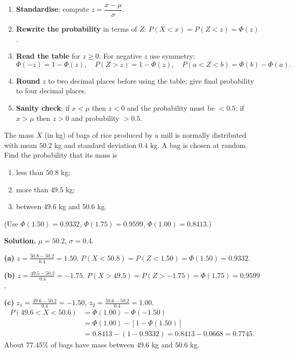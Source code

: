\documentclass[11pt]{article}
\begin{document}
\begin{methode}
\begin{enumerate}
\item \textbf{Standardise}: compute $z = \dfrac{x - \mu}{\sigma}$.
\item \textbf{Rewrite the probability} in terms of $Z$: $P(X < x) = P(Z < z) = \Phi(z)$.
\item \textbf{Read the table} for $z \geq 0$. For negative $z$ use symmetry:
\[
\Phi(-z) = 1 - \Phi(z), \quad P(Z > z) = 1 - \Phi(z), \quad P(a < Z < b) = \Phi(b) - \Phi(a).
\]
\item \textbf{Round} $z$ to two decimal places before using the table; give final probability to four decimal places.
\item \textbf{Sanity check}: if $x < \mu$ then $z < 0$ and the probability must be $< 0.5$; if $x > \mu$ then $z > 0$ and probability $> 0.5$.
\end{enumerate}
\end{methode}

\begin{exemplebox}
The mass $X$ (in kg) of bags of rice produced by a mill is normally distributed with mean $50.2$ kg and standard deviation $0.4$ kg. A bag is chosen at random. Find the probability that its mass is
\begin{enumerate}
\item[(a)] less than $50.8$ kg;
\item[(b)] more than $49.5$ kg;
\item[(c)] between $49.6$ kg and $50.6$ kg.
\end{enumerate}
(Use $\Phi(1.50) = 0.9332$, $\Phi(1.75) = 0.9599$, $\Phi(1.00) = 0.8413$.)
\end{exemplebox}

\begin{exoresolu}
\textbf{Solution.} $\mu = 50.2$, $\sigma = 0.4$.

\textbf{(a)} $z = \frac{50.8 - 50.2}{0.4} = 1.50$.
$P(X < 50.8) = P(Z < 1.50) = \Phi(1.50) = 0.9332$.

\textbf{(b)} $z = \frac{49.5 - 50.2}{0.4} = -1.75$.
$P(X > 49.5) = P(Z > -1.75) = \Phi(1.75) = 0.9599$.

\textbf{(c)} $z_1 = \frac{49.6 - 50.2}{0.4} = -1.50$, $z_2 = \frac{50.6 - 50.2}{0.4} = 1.00$.
\begin{align*}
P(49.6 < X < 50.6) &= \Phi(1.00) - \Phi(-1.50) \\
&= \Phi(1.00) - [1 - \Phi(1.50)] \\
&= 0.8413 - (1 - 0.9332) = 0.8413 - 0.0668 = 0.7745.
\end{align*}
About $77.45\%$ of bags have mass between $49.6$ kg and $50.6$ kg.
\end{exoresolu}
\end{document}
